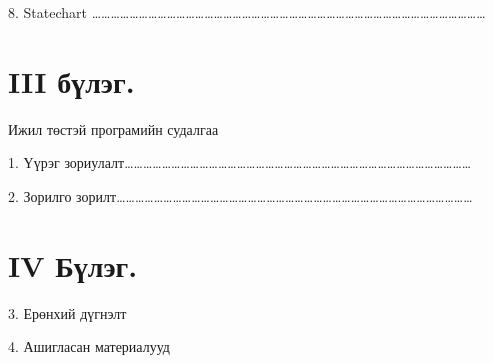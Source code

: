 \documentclass[12pt]{article}
\begin{document}
               8. Statechart
               ………………………………………………………………………………………………………………                   
               
                
                
               
\section     {III бүлэг.} Ижил төстэй програмийн судалгаа

               1.   Үүрэг зориулалт…………………………………………………………………………………………………  
               
               2.   Зорилго зорилт……………………………………………………………………………………………………
                   
               
\section     {IV Бүлэг.}     
               3.	Ерөнхий дүгнэлт
               
               4.	Ашигласан материалууд    
        
               
\end{document}
